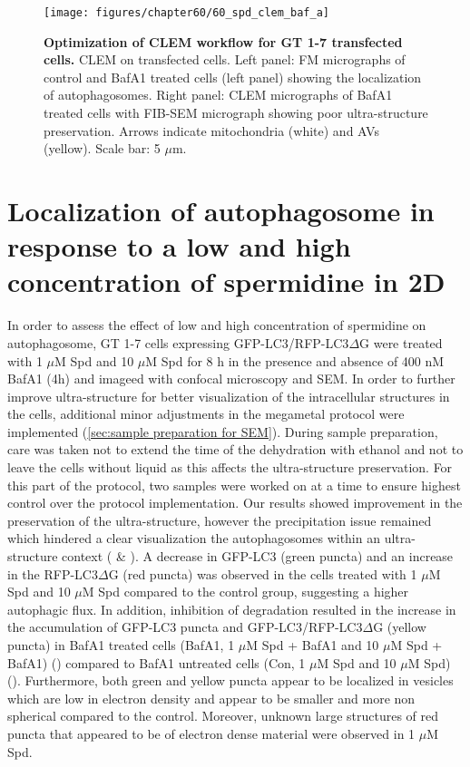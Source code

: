 \begin{landscape}
\begin{figure}[!htbp]
\center
  \texttt{[image: figures/chapter60/60\_spd\_clem\_baf\_a]}
  \caption[Optimization of CLEM workflow for GT 1-7 transfected cells]{\textbf{Optimization of CLEM workflow for GT 1-7 transfected cells.} CLEM on transfected cells. Left panel: FM micrographs of control and BafA1 treated cells (left panel) showing the localization of autophagosomes. Right panel: CLEM micrographs of BafA1 treated cells with FIB-SEM micrograph showing poor ultra-structure preservation. Arrows indicate mitochondria (white) and AVs (yellow). Scale bar: 5 $\mu$m.}
  \label{fig:60_spd_clem_baf_a}
\end{figure} 
\end{landscape}

\section{Localization of autophagosome in response to a low and high concentration of spermidine in 2D}
In order to assess the effect of low and high concentration of spermidine on autophagosome, GT 1-7 cells expressing GFP-LC3/RFP-LC3$\Delta$G were treated with 1 $\mu$M Spd and 10 $\mu$M Spd for 8 h in the presence and absence of 400 nM BafA1 (4h) and imageed with confocal microscopy and SEM. In order to further improve ultra-structure for better visualization of the intracellular structures in the cells, additional minor adjustments in the megametal protocol were implemented (\cref{sec:sample preparation for SEM}). During sample preparation, care was taken not to extend the time of the dehydration with ethanol and not to leave the cells without liquid as this affects the ultra-structure preservation. For this part of the protocol, two samples were worked on at a time to ensure highest control over the protocol implementation. Our results showed improvement in the preservation of the ultra-structure, however the precipitation issue remained which hindered a clear visualization the autophagosomes within an ultra-structure context ( \& ). A decrease in GFP-LC3 (green puncta) and an increase in the RFP-LC3$\Delta$G (red puncta) was observed in the cells treated with 1 $\mu$M Spd and 10 $\mu$M Spd compared to the control group, suggesting a higher autophagic flux. In addition, inhibition of degradation resulted in the increase in the accumulation of GFP-LC3 puncta  and GFP-LC3/RFP-LC3$\Delta$G (yellow puncta) in BafA1 treated cells (BafA1, 1 $\mu$M Spd + BafA1 and 10 $\mu$M Spd + BafA1) () compared to BafA1 untreated cells (Con, 1 $\mu$M Spd and 10 $\mu$M Spd) (). Furthermore, both green and yellow puncta appear to be localized in vesicles which are low in electron density and appear to be smaller and more non spherical compared to the control. Moreover, unknown large structures of red puncta that appeared to be of electron dense material were observed in 1 $\mu$M Spd. 

